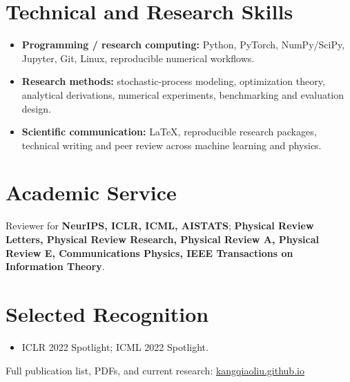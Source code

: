 \documentclass[10pt,a4paper]{article}
\begin{document}
\section*{Technical and Research Skills}
\begin{itemize}
  \item \textbf{Programming / research computing:} Python, PyTorch, NumPy/SciPy, Jupyter, Git, Linux, reproducible numerical workflows.
  \item \textbf{Research methods:} stochastic-process modeling, optimization theory, analytical derivations, numerical experiments, benchmarking and evaluation design.
  \item \textbf{Scientific communication:} LaTeX, reproducible research packages, technical writing and peer review across machine learning and physics.
\end{itemize}

\section*{Academic Service}
Reviewer for \textbf{NeurIPS, ICLR, ICML, AISTATS}; \textbf{Physical Review Letters, Physical Review Research, Physical Review A, Physical Review E, Communications Physics, IEEE Transactions on Information Theory}.

\section*{Selected Recognition}
\begin{itemize}
  \item ICLR 2022 Spotlight; ICML 2022 Spotlight.
\end{itemize}

\vfill
\footnotesize\textcolor{muted}{Full publication list, PDFs, and current research: \href{https://kangqiaoliu.github.io}{kangqiaoliu.github.io}}
\end{document}
